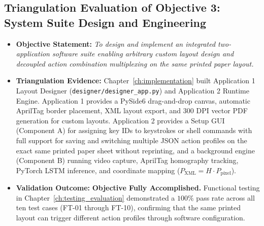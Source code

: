 \subsection{Triangulation Evaluation of Objective 3: System Suite Design and Engineering}
\label{sec:concl_obj3}
\begin{itemize}
    \item \textbf{Objective Statement:} \emph{To design and implement an integrated two-application software suite enabling arbitrary custom layout design and decoupled action combination multiplexing on the same printed paper layout.}
    \item \textbf{Triangulation Evidence:} Chapter~\ref{ch:implementation} built Application 1 Layout Designer (\texttt{designer/designer\_app.py}) and Application 2 Runtime Engine. Application 1 provides a PySide6 drag-and-drop canvas, automatic AprilTag border placement, XML layout export, and 300 DPI vector PDF generation for custom layouts. Application 2 provides a Setup GUI (Component A) for assigning key IDs to keystrokes or shell commands with full support for saving and switching multiple JSON action profiles on the exact same printed paper sheet without reprinting, and a background engine (Component B) running video capture, AprilTag homography tracking, PyTorch LSTM inference, and coordinate mapping ($P_{\text{XML}} = H \cdot P_{\text{pixel}}$).
    \item \textbf{Validation Outcome:} \textbf{Objective Fully Accomplished.} Functional testing in Chapter~\ref{ch:testing_evaluation} demonstrated a $100\%$ pass rate across all ten test cases (FT-01 through FT-10), confirming that the same printed layout can trigger different action profiles through software configuration.
\end{itemize}

